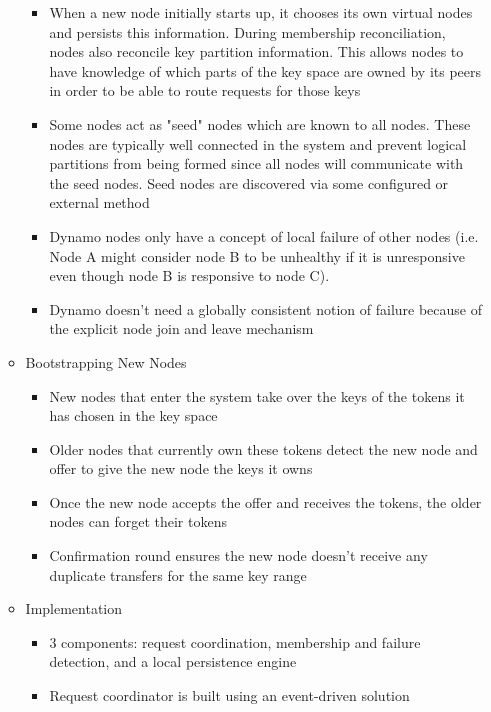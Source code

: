 \documentclass[a4paper]{article}
\begin{document}
\begin{itemize}
\begin{itemize}
\begin{itemize}
\item When a new node initially starts up, it chooses its own virtual nodes and persists this information. During membership reconciliation, nodes also reconcile key partition information. This allows nodes to have knowledge of which parts of the key space are owned by its peers in order to be able to route requests for those keys

\item Some nodes act as "seed" nodes which are known to all nodes. These nodes are typically well connected in the system and prevent logical partitions from being formed since all nodes will communicate with the seed nodes. Seed nodes are discovered via some configured or external method

\item Dynamo nodes only have a concept of local failure of other nodes (i.e. Node A might consider node B to be unhealthy if it is unresponsive even though node B is responsive to node C).

\item Dynamo doesn't need a globally consistent notion of failure because of the explicit node join and leave mechanism
\end{itemize}

\item Bootstrapping New Nodes
\begin{itemize}
\item New nodes that enter the system take over the keys of the tokens it has chosen in the key space

\item Older nodes that currently own these tokens detect the new node and offer to give the new node the keys it owns

\item Once the new node accepts the offer and receives the tokens, the older nodes can forget their tokens

\item Confirmation round ensures the new node doesn't receive any duplicate transfers for the same key range
\end{itemize}

\item Implementation
\begin{itemize}
\item 3 components: request coordination, membership and failure detection, and a local persistence engine

\item Request coordinator is built using an event-driven solution


\end{itemize}
\end{itemize}
\end{itemize}
\end{document}
